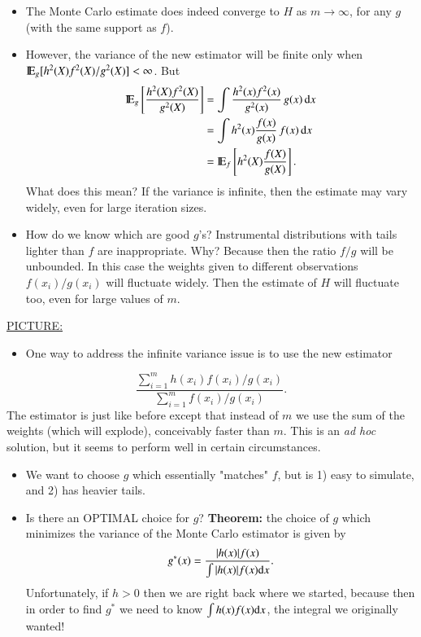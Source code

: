 \documentclass[11pt,english]{scrbook}
\begin{document}
\begin{itemize}
\item The Monte Carlo estimate does indeed converge to \(H\) as \(m \to \infty\), for any \(g\) (with the same support as \(f\)).

\item However, the variance of the new estimator will be finite only when \(\mathrm{I\hspace{-1.5pt}E}_{g}[h^{2}(X)f^{2}(X)/g^{2}(X)] < \infty\). But 
\begin{align*}
\mathrm{I\hspace{-1.5pt}E}_{g}\left[\frac{h^{2}(X)f^{2}(X)}{g^{2}(X)}\right] & =\int\frac{h^{2}(x)f^{2}(x)}{g^{2}(x)}\, g(x)\,\mathrm{d} x\\
& =\int h^{2}(x)\frac{f(x)}{g(x)}\, f(x)\,\mathrm{d} x\\
& =\mathrm{I\hspace{-1.5pt}E}_{f}\left[h^{2}(X)\frac{f(X)}{g(X)}\right].
\end{align*}
What does this mean? If the variance is infinite, then the estimate may vary widely, even for large iteration sizes.

\item How do we know which are good \(g\)'s? Instrumental distributions with tails lighter than \(f\) are inappropriate. Why? Because then the ratio \(f/g\) will be unbounded. In this case the weights given to different observations \(f(x_{i})/g(x_{i})\) will fluctuate widely. Then the estimate of \(H\) will fluctuate too, even for large values of \(m\).
\end{itemize}


\uline{PICTURE:} 

\vspace{1in}

\begin{itemize}
\item One way to address the infinite variance issue is to use the new estimator
\end{itemize}
\[
\frac{\sum_{i=1}^{m}h(x_{i})f(x_{i})/g(x_{i})}{\sum_{i=1}^{m}f(x_{i})/g(x_{i})}.
\]
The estimator is just like before except that instead of \(m\) we use the sum of the weights (which will explode), conceivably faster than \(m\). This is an \emph{ad hoc} solution, but it seems to perform well in certain circumstances. 

\begin{itemize}
\item We want to choose \(g\) which essentially "matches" \(f\), but is 1) easy to simulate, and 2) has heavier tails.

\item Is there an OPTIMAL choice for \(g\)? \textbf{Theorem:} the choice of \(g\) which minimizes the variance of the Monte Carlo estimator is given by 
\[
   g^{\ast}(x)=\frac{|h(x)|f(x)}{\int|h(x)|f(x)\mathrm{d} x}.
   \]
Unfortunately, if \(h > 0\) then we are right back where we started, because then in order to find \(g^{\ast}\) we need to know \(\int h(x)f(x)\mathrm{d} x\), the integral we originally wanted!
\end{itemize}
\end{document}
